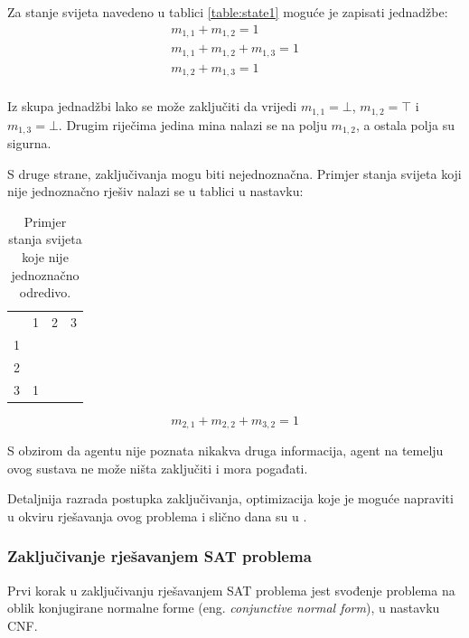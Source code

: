 \documentclass{article}
\numberwithin{figure}{section}
\numberwithin{table}{section}
\begin{document}
Za stanje svijeta navedeno u tablici \ref{table:state1} moguće je zapisati jednadžbe:
\begin{align*}
    m_{1, 1} + m_{1, 2} = 1 \\
    m_{1, 1} + m_{1, 2} + m_{1, 3} = 1 \\
    m_{1, 2} + m_{1, 3} = 1 \\
\end{align*}

Iz skupa jednadžbi lako se može zaključiti da vrijedi $m_{1, 1} = \bot$, $m_{1, 2} = \top$ i
$m_{1, 3} = \bot$. Drugim riječima jedina mina nalazi se na polju $m_{1, 2}$, a ostala polja su
sigurna.

S druge strane, zaključivanja mogu biti nejednoznačna. Primjer stanja svijeta koji nije
jednoznačno rješiv nalazi se u tablici u nastavku:
\begin{table}[ht]
    \centering
    \begin{tabular}{llll}
                           & 1                      & 2                     & 3                     \\ \cline{2-4}
    \multicolumn{1}{l|}{1} & \multicolumn{1}{l|}{}  & \multicolumn{1}{l|}{} & \multicolumn{1}{l|}{} \\ \cline{2-4}
    \multicolumn{1}{l|}{2} & \multicolumn{1}{l|}{}  & \multicolumn{1}{l|}{} & \multicolumn{1}{l|}{} \\ \cline{2-4}
    \multicolumn{1}{l|}{3} & \multicolumn{1}{l|}{1} & \multicolumn{1}{l|}{} & \multicolumn{1}{l|}{} \\ \cline{2-4}
    \end{tabular}
    \label{table:state2}
    \caption{Primjer stanja svijeta koje nije jednoznačno odredivo.}
\end{table}

\begin{equation}
    m_{2, 1} + m_{2, 2} + m_{3, 2} = 1
    \label{eq:state2}
\end{equation}

S obzirom da agentu nije poznata nikakva druga informacija, agent na temelju ovog sustava ne
može ništa zaključiti i mora pogađati.

Detaljnija razrada postupka zaključivanja, optimizacija koje je moguće napraviti u okviru
rješavanja ovog problema i slično dana su u \cite{berkeley08, berkeley09}.

\subsubsection{Zaključivanje rješavanjem SAT problema} \label{sat}
Prvi korak u zaključivanju rješavanjem SAT problema jest svođenje
problema na oblik konjugirane normalne forme (eng. \textit{conjunctive normal form}), u nastavku CNF.
\end{document}
